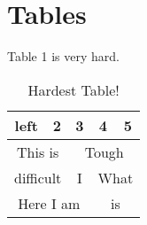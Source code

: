 \documentclass[14pt, a4paper]{article}
\begin{document}
    \section*{Tables}
    Table 1 is very hard.
    \begin{table}[H]
    \centering
    \begin{tabular}{|c|c|c|c|c|}
       \hline
       left  & 2 & 3 & 4 & 5 \\
       \hline
       \multicolumn{2}{c}{This is } & \multicolumn{3}{c}{Tough}\\
       \cline{3-5}
       \multicolumn{2}{c}{difficult } & I & \multicolumn{2}{c|}{What}\\
       \cline{1-3}
       \multicolumn{3}{|c|}{Here I am } & \multicolumn{2}{c|}{is} \\
        \hline
    \end{tabular}
    \caption{ Hardest Table!}
    \end{table}
\end{document}
